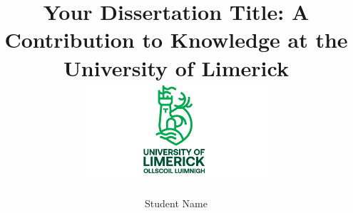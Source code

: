 \documentclass[12pt,oneside,letterpaper, oldfontcommands]{memoir}
\title{  \Large Your Dissertation Title: A Contribution to Knowledge at the University of Limerick \\[1.5cm]
\includegraphics[width=7.1cm]{photos/logonew2020.jpg} }
\author{Student Name}
\begin{document}
\maketitle
\makefrontmatter







\OnehalfSpacing





\end{document}
